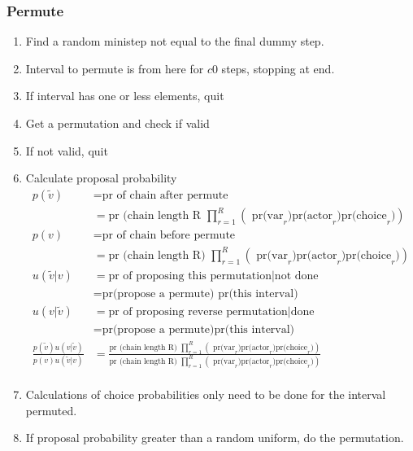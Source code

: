 \documentclass[12pt,a4paper]{article}
\renewcommand{\=}{\,=\,}
\newcommand{\+}{\,+\,}
\begin{document}
\subsubsection{Permute}
\begin{enumerate}
\item Find a random ministep not equal to the final dummy step.
\item Interval to permute is from here for $c0$ steps, stopping at end.
\item If interval has one or less elements, quit
\item Get a permutation and check if valid
\item If not valid, quit
\item Calculate proposal probability
\begin{align*}
 p(\tilde{v})&=\text{pr of chain after permute}\\
 & = \text{pr (chain length R }
  \prod_{r=1}^{R} \left( \text{ pr(var}_r )
 \text{pr(actor}_r)\text{pr(choice}_r) \right)\\
 p(v)&=\text{pr of chain before permute} \\
  & = \text{pr (chain length R) }
  \prod_{r=1}^{R} \left( \text{ pr(var}_r )
 \text{pr(actor}_r)\text{pr(choice}_r) \right)\\
 u(\tilde{v}|v) &= \text{pr of proposing this permutation} | \text{not
   done}\\
 &=\text{pr(propose a permute) pr(this interval)}\\
u(v|\tilde{v}) &= \text{pr of proposing reverse permutation} | \text{done}\\
 &=
 \text{pr(propose a permute)}\text{pr(this interval)}\\
\frac{p(\tilde{v}) u(v|\tilde{v})}
  {p(v) u(\tilde{v}|v)}&=\frac{ \text{pr (chain length R) }
\prod_{r=1}^{R} \left( \text{ pr(var}_r)
 \text{pr(actor}_r)\text{pr(choice}_r)\right) }
{ \text{pr (chain length R) }\prod_{r=1}^{R} \left( \text{ pr(var}_r )
 \text{pr(actor}_r)\text{pr(choice}_r) \right)}\\
\end{align*}
\item Calculations of choice probabilities only need to be done for the interval
  permuted.
\item If proposal probability greater than a random uniform, do the permutation.
\end{enumerate}
\end{document}
